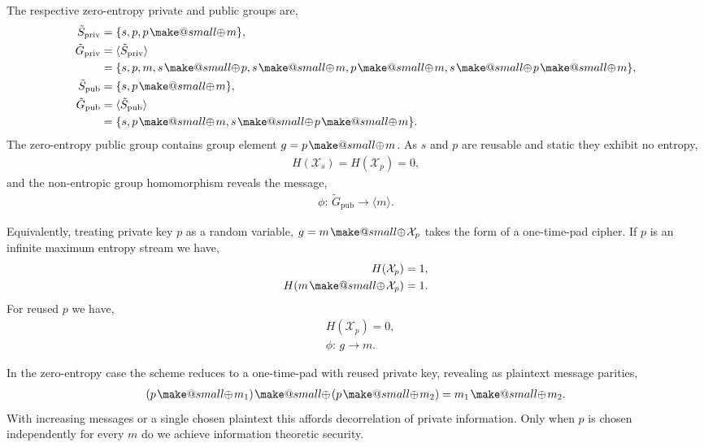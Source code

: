 \documentclass[twocolumn, aps, amsmath, amssymb, nofootinbib, superscriptaddress, longbibliography, doublefloatfix, table-of-contents, eqsecnum, rmp]{revtex4-2}
\makeatletter
\newcommand{\soplus}{{{\hspace{1pt}}{\mathbin{\mathpalette\make@small{\mathbin\oplus}}}}{\hspace{1pt}}}
\newcommand{\make@small}[2]{%
  \vcenter{\hbox{%
    \scalebox{0.6}{$\m@th#1#2$}%
  }}%
}
\makeatother
\begin{document}
The respective zero-entropy private and public groups are,
\begin{align}
	{\tilde S}_\mathrm{priv} &= \{s, p, p \soplus m\},\nonumber\\
	{\tilde G}_\mathrm{priv} &= \langle {\tilde S}_\mathrm{priv} \rangle \nonumber\\
	&= \{s, p, m, s\soplus p, s\soplus m, p\soplus m, s\soplus p\soplus m\},\nonumber\\
	{\tilde S}_\mathrm{pub} &= \{s, p \soplus m\},\nonumber\\
	{\tilde G}_\mathrm{pub} &= \langle {\tilde S}_\mathrm{pub} \rangle \nonumber\\
	&= \{s, p\soplus m, s\soplus p\soplus m\}.
\end{align}
The zero-entropy public group contains group element $g=p\soplus m$. As $s$ and $p$ are reusable and static they exhibit no entropy,
\begin{align}
	H(\mathcal{X}_s)=H(\mathcal{X}_p)=0,	
\end{align}
and the non-entropic group homomorphism reveals the message,
\begin{align}
	\phi:\, \tilde{G}_\mathrm{pub} \to \langle m\rangle.
\end{align}

Equivalently, treating private key $p$ as a random variable, $g=m\soplus \mathcal{X}_p$ takes the form of a one-time-pad cipher. If $p$ is an infinite maximum entropy stream we have,
\begin{align}
	H(\mathcal{X}_p) &= 1,\nonumber\\
	H(m\soplus \mathcal{X}_p) &= 1.
\end{align}
For reused $p$ we have,
\begin{align}
	&H(\mathcal{X}_p) = 0,\nonumber\\
	&\phi: \,g\to m.
\end{align}

In the zero-entropy case the scheme reduces to a one-time-pad with reused private key, revealing as plaintext message parities,
\begin{align}
	(p\soplus m_1) \soplus (p \soplus m_2) = m_1 \soplus m_2.
\end{align}
With increasing messages or a single chosen plaintext this affords decorrelation of private information. Only when $p$ is chosen independently for every $m$ do we achieve information theoretic security.

\end{document}
